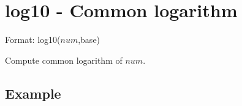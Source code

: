 
%

\section{log10 - Common logarithm\label{sect:log10}}

Format: log10($num$,base)

Compute common logarithm of $num$.

\subsection*{Example}


%
